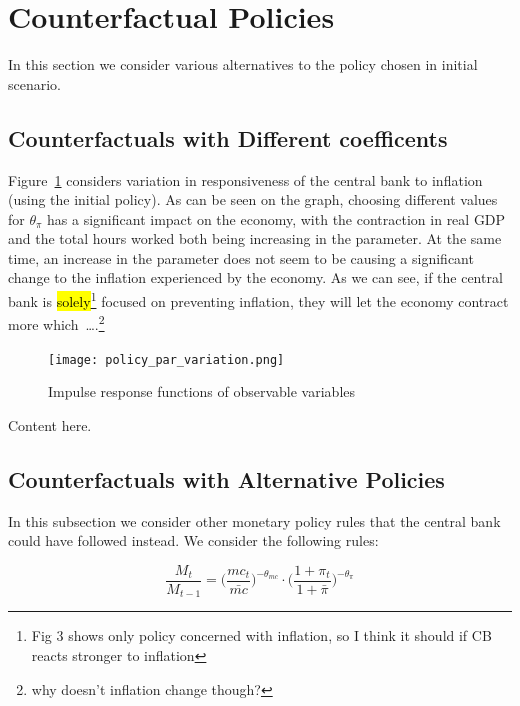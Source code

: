 \documentclass[12pt]{article}
\begin{document}
\newpage
\section{Counterfactual Policies}\label{s:counterfactual_policy}
In this section we consider various alternatives to the policy chosen in initial scenario.

\subsection*{Counterfactuals with Different coefficents}

Figure~\ref{fig:policy_par_variation} considers variation in responsiveness of the central bank to inflation (using the initial policy). As can be seen on the graph, choosing different values for $\theta_{\pi}$ has a significant impact on the economy, with the contraction in real GDP and the total hours worked both being increasing in the parameter. At the same time, an increase in the parameter does not seem to be causing a significant change to the inflation experienced by the economy. As we can see, if the central bank is \hl{solely}\footnote{Fig 3 shows only policy concerned with inflation, so I think it should if CB reacts stronger to inflation} focused on preventing inflation, they will let the economy contract more which\ \dots.\footnote{why doesn't inflation change though?}

\begin{figure}[!h]
    \caption{Impulse response functions of observable variables}\label{fig:policy_par_variation}
    \centering
    \texttt{[image: policy\_par\_variation.png]}
\end{figure}
Content here.


\subsection*{Counterfactuals with Alternative Policies}

In this subsection we consider other monetary policy rules that the central bank could have followed instead. We consider the following rules:

\begin{equation}\label{eq:mc_rule}
    \frac{M_t}{M_{t-1}}
          = \Big(\frac{mc_t}{\bar{mc}}\Big)^{-\theta_{mc}}
            \cdot \Big(\frac{1 + \pi_t}{1 + \bar{\pi}}\Big)^{-\theta_{\pi}}
\end{equation}
\end{document}

